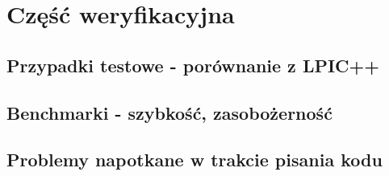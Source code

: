 \section{Część weryfikacyjna} %
\subsection{Przypadki testowe - porównanie z LPIC++}
\subsection{Benchmarki - szybkość, zasobożerność} %
\subsection{Problemy napotkane w trakcie pisania kodu}
